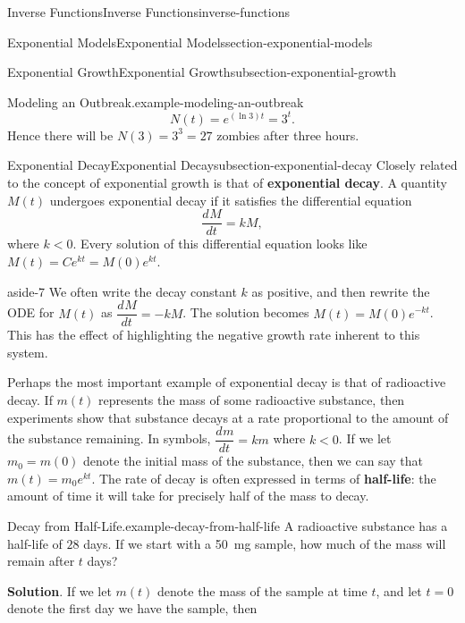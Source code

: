 \documentclass[oneside,10pt,]{book}
\newcommand{\terminology}[1]{\textbf{#1}}
\numberwithin{equation}{section}
\newcommand{\dv}[3][]{\dfrac{d^{#1} #2}{d #3^{#1}}}
\begin{document}
\begin{chapterptx}{Inverse Functions}{}{Inverse Functions}{}{}{inverse-functions}
\begin{sectionptx}{Exponential Models}{}{Exponential Models}{}{}{section-exponential-models}
\begin{subsectionptx}{Exponential Growth}{}{Exponential Growth}{}{}{subsection-exponential-growth}
\begin{example}{Modeling an Outbreak.}{example-modeling-an-outbreak}
\begin{equation*}
N(t) = e^{(\ln 3)t} = 3^{t}.
\end{equation*}
Hence there will be \(N(3) = 3^{3} = 27\) zombies after three hours.%
\end{example}
\end{subsectionptx}
%
%
\typeout{************************************************}
\typeout{************************************************}
%
\begin{subsectionptx}{Exponential Decay}{}{Exponential Decay}{}{}{subsection-exponential-decay}
\hypertarget{p-252}{}%
Closely related to the concept of exponential growth is that of \terminology{exponential decay}. A quantity \(M(t)\) undergoes exponential decay if it satisfies the differential equation%
\begin{equation*}
\dv{M}{t} = kM,
\end{equation*}
where \(k < 0\). Every solution of this differential equation looks like \(M(t) = Ce^{kt} = M(0)e^{kt}\).%
\begin{aside}{}{aside-7}%
\hypertarget{p-253}{}%
We often write the decay constant \(k\) as positive, and then rewrite the ODE for \(M(t)\) as \(\dv{M}{t} = -kM\). The solution becomes \(M(t) = M(0)e^{-kt}\). This has the effect of highlighting the negative growth rate inherent to this system.%
\end{aside}
\hypertarget{p-254}{}%
Perhaps the most important example of exponential decay is that of radioactive decay. If \(m(t)\) represents the mass of some radioactive substance, then experiments show that substance decays at a rate proportional to the amount of the substance remaining. In symbols, \(\dv{m}{t} = km\) where \(k < 0\). If we let \(m_{0} = m(0)\) denote the initial mass of the substance, then we can say that \(m(t) = m_{0}e^{kt}\). The rate of decay is often expressed in terms of \terminology{half-life}: the amount of time it will take for precisely half of the mass to decay.%
\begin{example}{Decay from Half-Life.}{example-decay-from-half-life}%
\hypertarget{p-255}{}%
A radioactive substance has a half-life of \(28\) days. If we start with a \SI{50}{\milli\gram} sample, how much of the mass will remain after \(t\) days?%
\par\smallskip%
\noindent\textbf{Solution}.\hypertarget{solution-55}{}\quad%
\hypertarget{p-256}{}%
If we let \(m(t)\) denote the mass of the sample at time \(t\), and let \(t=0\) denote the first day we have the sample, then%

\end{example}
\end{subsectionptx}
\end{sectionptx}
\end{chapterptx}
\end{document}
